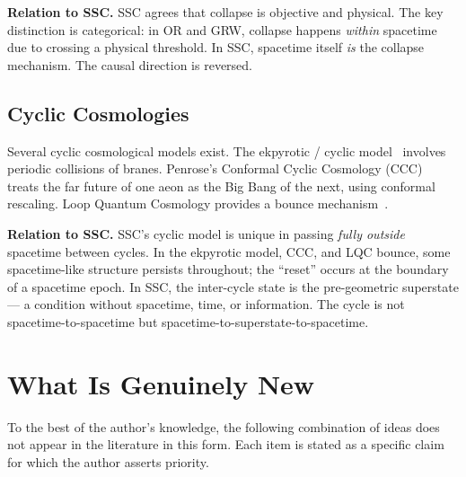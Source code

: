 \documentclass[12pt,a4paper]{article}
\begin{document}
\textbf{Relation to SSC.}  SSC agrees that collapse is objective and
physical.  The key distinction is categorical: in OR and GRW, collapse
happens \emph{within} spacetime due to crossing a physical threshold.
In SSC, spacetime itself \emph{is} the collapse mechanism.  The causal
direction is reversed.

\subsection{Cyclic Cosmologies}

Several cyclic cosmological models exist.  The ekpyrotic / cyclic
model~\citep{steinhardt2002} involves periodic collisions of branes.
Penrose's Conformal Cyclic Cosmology (CCC)~\citep{penrose2010} treats
the far future of one aeon as the Big Bang of the next, using conformal
rescaling.  Loop Quantum Cosmology provides a bounce
mechanism~\citep{ashtekar2006}.

\textbf{Relation to SSC.}  SSC's cyclic model is unique in passing
\emph{fully outside} spacetime between cycles.  In the ekpyrotic
model, CCC, and LQC bounce, some spacetime-like structure persists
throughout; the ``reset'' occurs at the boundary of a spacetime epoch.
In SSC, the inter-cycle state is the pre-geometric superstate — a
condition without spacetime, time, or information.  The cycle is not
spacetime-to-spacetime but spacetime-to-superstate-to-spacetime.

\section{What Is Genuinely New}
\label{sec:new}

To the best of the author's knowledge, the following combination of
ideas does not appear in the literature in this form.  Each item is
stated as a specific claim for which the author asserts priority.
\end{document}
